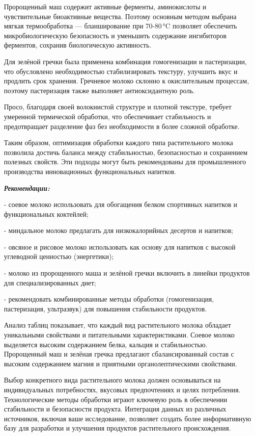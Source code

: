 \begin{multicols}{2}
Пророщенный маш содержит активные ферменты, аминокислоты и
чувствительные биоактивные вещества. Поэтому основным методом выбрана
мягкая термообработка --- бланширование при 70-80\,°C позволяет
обеспечить микробиологическую безопасность и уменьшить содержание
ингибиторов ферментов, сохранив биологическую активность.

Для зелёной гречки была применена комбинация гомогенизации и
пастеризации, что обусловлено необходимостью стабилизировать текстуру,
улучшить вкус и продлить срок хранения. Гречневое молоко склонно к
окислительным процессам, поэтому пастеризация также выполняет
антиоксидантную роль.

Просо, благодаря своей волокнистой структуре и плотной текстуре, требует
умеренной термической обработки, что обеспечивает стабильность и
предотвращает разделение фаз без необходимости в более сложной
обработке.

Таким образом, оптимизация обработки каждого типа растительного молока
позволила достичь баланса между стабильностью, безопасностью и
сохранением полезных свойств. Эти подходы могут быть рекомендованы для
промышленного производства инновационных функциональных напитков.

\emph{{\bfseries Рекомендации:}}

- соевое молоко использовать для обогащения белком спортивных напитков и
функциональных коктейлей;

- миндальное молоко предлагать для низкокалорийных десертов и напитков;

- овсяное и рисовое молоко использовать как основу для напитков с
высокой углеводной ценностью (энергетики);

- молоко из пророщенного маша и зелёной гречки включить в линейки
продуктов для специализированных диет;

- рекомендовать комбинированные методы обработки (гомогенизация,
пастеризация, ультразвук) для повышения стабильности продуктов.

Анализ таблиц показывает, что каждый вид растительного молока обладает
уникальными свойствами и питательными характеристиками. Соевое молоко
выделяется высоким содержанием белка, кальция и стабильностью.
Пророщенный маш и зелёная гречка предлагают сбалансированный состав с
высоким содержанием магния и приятными органолептическими свойствами.

Выбор конкретного вида растительного молока должен основываться на
индивидуальных потребностях, вкусовых предпочтениях и целях потребления.
Технологические методы обработки играют ключевую роль в обеспечении
стабильности и безопасности продукта. Интеграция данных из различных
источников, включая ваше исследование, позволяет создать более
информативную базу для разработки и улучшения продуктов растительного
происхождения.


\end{multicols}
